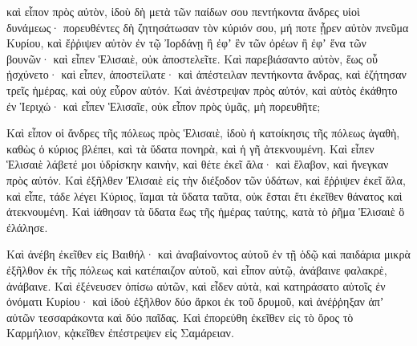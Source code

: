 {καὶ εἶπον πρὸς αὐτὸν, ἰδοὺ δὴ μετὰ τῶν παίδων σου πεντήκοντα ἄνδρες υἱοὶ δυνάμεως· πορευθέντες δὴ ζητησάτωσαν τὸν κύριόν σου, μή ποτε ᾖρεν αὐτὸν πνεῦμα Κυρίου, καὶ ἔῤῥιψεν αὐτὸν ἐν τῷ Ἰορδάνῃ ἢ ἐφʼ ἓν τῶν ὀρέων ἢ ἐφʼ ἕνα τῶν βουνῶν· καὶ εἶπεν Ἑλισαιὲ, οὐκ ἀποστελεῖτε.
Καὶ παρεβιάσαντο αὐτὸν, ἕως οὗ ᾐσχύνετο· καὶ εἶπεν, ἀποστείλατε· καὶ ἀπέστειλαν πεντήκοντα ἄνδρας, καὶ ἐζήτησαν τρεῖς ἡμέρας, καὶ οὐχ εὗρον αὐτόν.
Καὶ ἀνέστρεψαν πρὸς αὐτόν, καὶ αὐτὸς ἐκάθητο ἐν Ἱεριχώ· καὶ εἶπεν Ἑλισαῖε, οὐκ εἶπον πρὸς ὑμᾶς, μὴ πορευθῆτε;
\par }{\PP {}Καὶ εἶπον οἱ ἄνδρες τῆς πόλεως πρὸς Ἑλισαιὲ, ἰδοὺ ἡ κατοίκησις τῆς πόλεως ἀγαθὴ, καθὼς ὁ κύριος βλέπει, καὶ τὰ ὕδατα πονηρὰ, καὶ ἡ γῆ ἀτεκνουμένη.
Καὶ εἶπεν Ἑλισαιὲ λάβετέ μοι ὑδρίσκην καινὴν, καὶ θέτε ἐκεῖ ἅλα· καὶ ἔλαβον, καὶ ἤνεγκαν πρὸς αὐτόν.
Καὶ ἐξῆλθεν Ἐλισαιὲ εἰς τὴν διέξοδον τῶν ὑδάτων, καὶ ἔῤῥιψεν ἐκεῖ ἅλα, καὶ εἶπε, τάδε λέγει Κύριος, ἴαμαι τὰ ὕδατα ταῦτα, οὐκ ἔσται ἔτι ἐκεῖθεν θάνατος καὶ ἀτεκνουμένη.
Καὶ ἰάθησαν τὰ ὕδατα ἕως τῆς ἡμέρας ταύτης, κατὰ τὸ ῥῆμα Ἑλισαιὲ ὃ ἐλάλησε.
\par }{\PP {}Καὶ ἀνέβη ἐκεῖθεν εἰς Βαιθήλ· καὶ ἀναβαίνοντος αὐτοῦ ἐν τῇ ὁδῷ καὶ παιδάρια μικρὰ ἐξῆλθον ἐκ τῆς πόλεως καὶ κατέπαιζον αὐτοῦ, καὶ εἶπον αὐτῷ, ἀνάβαινε φαλακρὲ, ἀνάβαινε.
Καὶ ἐξένευσεν ὀπίσω αὐτῶν, καὶ εἶδεν αὐτὰ, καὶ κατηράσατο αὐτοῖς ἐν ὀνόματι Κυρίου· καὶ ἰδοὺ ἐξῆλθον δύο ἄρκοι ἐκ τοῦ δρυμοῦ, καὶ ἀνέῤῥηξαν ἀπʼ αὐτῶν τεσσαράκοντα καὶ δύο παῖδας.
Καὶ ἐπορεύθη ἐκεῖθεν εἰς τὸ ὄρος τὸ Καρμήλιον, κᾀκεῖθεν ἐπέστρεψεν εἰς Σαμάρειαν.

}
